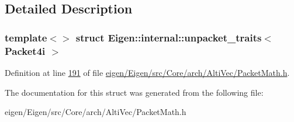 \subsection{Detailed Description}
\subsubsection*{template$<$$>$\newline
struct Eigen\+::internal\+::unpacket\+\_\+traits$<$ Packet4i $>$}



Definition at line \hyperlink{eigen_2_eigen_2src_2_core_2arch_2_alti_vec_2_packet_math_8h_source_l00191}{191} of file \hyperlink{eigen_2_eigen_2src_2_core_2arch_2_alti_vec_2_packet_math_8h_source}{eigen/\+Eigen/src/\+Core/arch/\+Alti\+Vec/\+Packet\+Math.\+h}.



The documentation for this struct was generated from the following file\+:\begin{DoxyCompactItemize}
\item 
eigen/\+Eigen/src/\+Core/arch/\+Alti\+Vec/\+Packet\+Math.\+h\end{DoxyCompactItemize}
